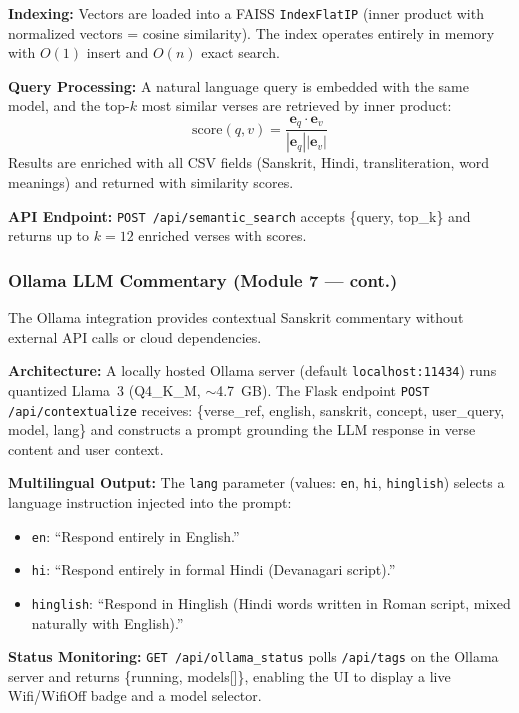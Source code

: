 \documentclass[conference]{IEEEtran}
\begin{document}
\textbf{Indexing:} Vectors are loaded into a FAISS \texttt{IndexFlatIP}
(inner product with normalized vectors = cosine similarity). The index
operates entirely in memory with $O(1)$ insert and $O(n)$ exact search.

\textbf{Query Processing:} A natural language query is embedded with the
same model, and the top-$k$ most similar verses are retrieved by inner
product:
\begin{equation}
  \text{score}(q, v) = \frac{\mathbf{e}_q \cdot \mathbf{e}_v}
  {|\mathbf{e}_q||\mathbf{e}_v|}
  \label{eq:cosine}
\end{equation}
Results are enriched with all CSV fields (Sanskrit, Hindi, transliteration,
word meanings) and returned with similarity scores.

\textbf{API Endpoint:} \texttt{POST /api/semantic\_search} accepts
\{query, top\_k\} and returns up to $k = 12$ enriched verses with scores.

\subsubsection{Ollama LLM Commentary (Module 7 — cont.)}

The Ollama integration provides contextual Sanskrit commentary without
external API calls or cloud dependencies.

\textbf{Architecture:} A locally hosted Ollama server (default
\texttt{localhost:11434}) runs quantized Llama~3 (Q4\_K\_M, $\sim$4.7~GB).
The Flask endpoint \texttt{POST /api/contextualize} receives:
\{verse\_ref, english, sanskrit, concept, user\_query, model, lang\}
and constructs a prompt grounding the LLM response in verse content and user context.

\textbf{Multilingual Output:} The \texttt{lang} parameter (values: \texttt{en},
\texttt{hi}, \texttt{hinglish}) selects a language instruction injected into the
prompt:
\begin{itemize}[leftmargin=*]
  \item \texttt{en}: ``Respond entirely in English.''
  \item \texttt{hi}: ``Respond entirely in formal Hindi (Devanagari script).''
  \item \texttt{hinglish}: ``Respond in Hinglish (Hindi words written in Roman
        script, mixed naturally with English).''
\end{itemize}

\textbf{Status Monitoring:} \texttt{GET /api/ollama\_status} polls
\texttt{/api/tags} on the Ollama server and returns \{running, models[]\},
enabling the UI to display a live Wifi/WifiOff badge and a model selector.
\end{document}
